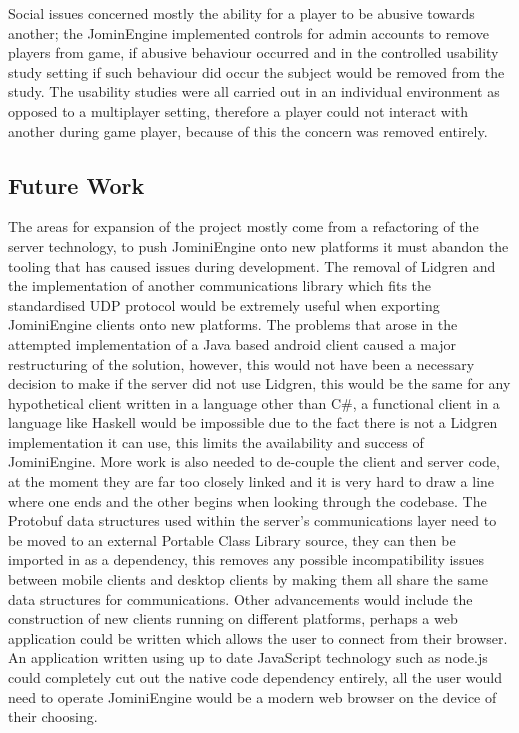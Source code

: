 \documentclass{article}
\begin{document}
Social issues concerned mostly the ability for a player to be abusive towards another; the JominEngine implemented controls for admin accounts to remove players from game, if abusive behaviour occurred and in the controlled usability study setting if such behaviour did occur the subject would be removed from the study. The usability studies were all carried out in an individual environment as opposed to a multiplayer setting, therefore a player could not interact with another during game player, because of this the concern was removed entirely. 

\subsection{Future Work}
The areas for expansion of the project mostly come from a refactoring of the server technology, to push JominiEngine onto new platforms it must abandon the tooling that has caused issues during development. The removal of Lidgren and the implementation of another communications library which fits the standardised UDP protocol would be extremely useful when exporting JominiEngine clients onto new platforms. The problems that arose in the attempted implementation of a Java based android client caused a major restructuring of the solution, however, this would not have been a necessary decision to make if the server did not use Lidgren, this would be the same for any hypothetical client written in a language other than C\#, a functional client in a language like Haskell would be impossible due to the fact there is not a Lidgren implementation it can use, this limits the availability and success of JominiEngine. 
More work is also needed to de-couple the client and server code, at the moment they are far too closely linked and it is very hard to draw a line where one ends and the other begins when looking through the codebase. The Protobuf data structures used within the server’s communications layer need to be moved to an external Portable Class Library source, they can then be imported in as a dependency, this removes any possible incompatibility issues between mobile clients and desktop clients by making them all share the same data structures for communications.
Other advancements would include the construction of new clients running on different platforms, perhaps a web application could be written which allows the user to connect from their browser. An application written using up to date JavaScript technology such as node.js could completely cut out the native code dependency entirely, all the user would need to operate JominiEngine would be a modern web browser on the device of their choosing.	
	\newpage
\end{document}
